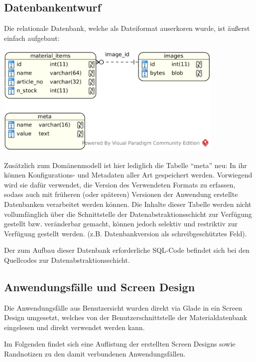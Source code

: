 \subsection{Datenbankentwurf}
Die relationale Datenbank, welche als Dateiformat auserkoren wurde, ist äußerst
einfach aufgebaut:

\begin{center}
\noindent\includegraphics[width=110mm,keepaspectratio]{images/03-datenbankmodell.png}
\end{center}

Zusätzlich zum Domänenmodell ist hier lediglich die Tabelle ``meta'' neu: In ihr können
Konfigurations- und Metadaten aller Art gespeichert werden. Vorwiegend wird sie dafür
verwendet, die Version des Verwendeten Formats zu erfassen, sodass auch mit früheren
(oder späteren) Versionen der Anwendung erstellte Datenbanken verarbeitet werden können.
Die Inhalte dieser Tabelle werden nicht vollumfänglich über die Schnittstelle der
Datenabstraktionsschicht zur Verfügung gestellt bzw. veränderbar gemacht, können jedoch selektiv
und restriktiv zur Verfügung gestellt werden. (z.B. Datenbankversion als schreibgeschütztes Feld).

Der zum Aufbau dieser Datenbank erforderliche SQL-Code befindet sich bei den Quellcodes
zur Datenabstraktionsschicht.

\subsection{Anwendungsfälle und Screen Design}
Die Anwendungsfälle aus Benutzersicht wurden direkt via Glade in ein Screen Design umgesetzt, welches von der
Benutzerschnittstelle der Materialdatenbank eingelesen und direkt verwendet werden kann.

Im Folgenden findet sich eine Auflistung der erstellten Screen Designs sowie Randnotizen zu den damit verbundenen
Anwendungsfällen.

